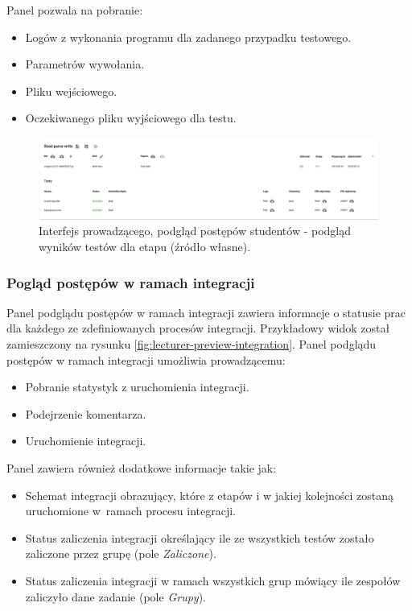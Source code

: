 Panel pozwala na pobranie:
\begin{itemize}
    \item Logów z wykonania programu dla zadanego przypadku testowego.
    \item Parametrów wywołania.
    \item Pliku wejściowego.
    \item Oczekiwanego pliku wyjściowego dla testu.
\end{itemize}

\begin{figure}[h]
    \centering
    \includegraphics[width = 13cm]{chapter04/lecturer_preview_stage_tests.png}
    \caption{Interfejs prowadzącego, podgląd postępów studentów - podgląd wyników testów dla etapu (źródło własne).}
    \label{fig:lecturer-preview-stage-tests}
\end{figure}

\subsubsection{Pogląd postępów w ramach integracji}

Panel podglądu postępów w ramach integracji zawiera informacje o statusie prac dla każdego ze zdefiniowanych procesów integracji.
Przykładowy widok został zamieszczony na rysunku \ref{fig:lecturer-preview-integration}.
Panel podglądu postępów w ramach integracji umożliwia prowadzącemu:
\begin {itemize}
    \item Pobranie statystyk z uruchomienia integracji.
    \item Podejrzenie komentarza.
    \item Uruchomienie integracji.
\end {itemize}

Panel zawiera również dodatkowe informacje takie jak:
\begin{itemize}
    \item Schemat integracji obrazujący, które z etapów i w jakiej kolejności zostaną uruchomione w~ramach procesu integracji.
    \item Status zaliczenia integracji określający ile ze wszystkich testów zostało zaliczone przez grupę (pole \textit{Zaliczone}).
    \item Status zaliczenia integracji w ramach wszystkich grup mówiący ile zespołów zaliczyło dane zadanie (pole \textit{Grupy}).
\end{itemize}

